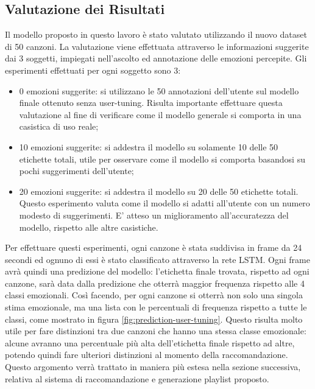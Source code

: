 \documentclass[11pt]{report}
\begin{document}
\newpage

\subsection{Valutazione dei Risultati}


Il modello proposto in questo lavoro è stato valutato utilizzando il nuovo dataset di 50 canzoni. La valutazione viene effettuata attraverso le informazioni suggerite dai 3 soggetti, impiegati nell'ascolto ed annotazione delle emozioni percepite. Gli esperimenti effettuati per ogni soggetto sono 3:
\begin{itemize}
    \item 0 emozioni suggerite: si utilizzano le 50 annotazioni dell'utente sul modello finale ottenuto senza user-tuning. Risulta importante effettuare questa valutazione al fine di verificare come il modello generale si comporta in una casistica di uso reale;
    
    \item 10 emozioni suggerite: si addestra il modello su solamente 10 delle 50 etichette totali, utile per osservare come il modello si comporta basandosi su pochi suggerimenti dell'utente;
    
    \item 20 emozioni suggerite: si addestra il modello su 20 delle 50 etichette totali. Questo esperimento valuta come il modello si adatti all'utente con un numero modesto di suggerimenti. E' atteso un miglioramento all'accuratezza del modello, rispetto alle altre casistiche.
\end{itemize}

Per effettuare questi esperimenti, ogni canzone è stata suddivisa in frame da 24 secondi ed ognuno di essi è stato classificato attraverso la rete LSTM. Ogni frame avrà quindi una predizione del modello: l'etichetta finale trovata, rispetto ad ogni canzone, sarà data dalla predizione che otterrà maggior frequenza rispetto alle 4 classi emozionali. Così facendo, per ogni canzone si otterrà non solo una singola stima emozionale, ma una lista con le percentuali di frequenza rispetto a tutte le classi, come mostrato in figura \ref{fig:prediction-user-tuning}. Questo risulta molto utile per fare distinzioni tra due canzoni che hanno una stessa classe emozionale: alcune avranno una percentuale più alta dell'etichetta finale rispetto ad altre, potendo quindi fare ulteriori distinzioni al momento della raccomandazione. Questo argomento verrà trattato in maniera più estesa nella sezione successiva, relativa al sistema di raccomandazione e generazione playlist proposto.
\end{document}
